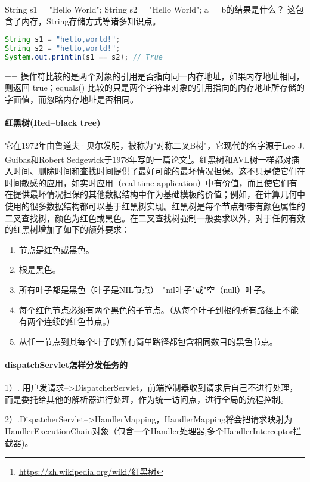 \documentclass[../../../interview-questions.tex]{subfiles}
\begin{document}
String s1 = "Hello World"; String s2 = "Hello World"; a==b的结果是什么？ 这包含了内存，String存储方式等诸多知识点。

\begin{lstlisting}[language=Java]
String s1 = "hello,world!";
String s2 = "hello,world!";
System.out.println(s1 == s2); // True
\end{lstlisting}

== 操作符比较的是两个对象的引用是否指向同一内存地址，如果内存地址相同，则返回 true；equals() 比较的只是两个字符串对象的引用指向的内存地址所存储的字面值，而忽略内存地址是否相同。


\paragraph{红黑树(Red–black tree)}

它在1972年由鲁道夫·贝尔发明，被称为"对称二叉B树"，它现代的名字源于Leo J. Guibas和Robert Sedgewick于1978年写的一篇论文\footnote{\url{https://zh.wikipedia.org/wiki/红黑树}}。红黑树和AVL树一样都对插入时间、删除时间和查找时间提供了最好可能的最坏情况担保。这不只是使它们在时间敏感的应用，如实时应用（real time application）中有价值，而且使它们有在提供最坏情况担保的其他数据结构中作为基础模板的价值；例如，在计算几何中使用的很多数据结构都可以基于红黑树实现。红黑树是每个节点都带有颜色属性的二叉查找树，颜色为红色或黑色。在二叉查找树强制一般要求以外，对于任何有效的红黑树增加了如下的额外要求：

\begin{enumerate}
\item {节点是红色或黑色。}
\item{根是黑色。}
\item{所有叶子都是黑色（叶子是NIL节点）--"nil叶子"或"空（null）叶子。}
\item{每个红色节点必须有两个黑色的子节点。（从每个叶子到根的所有路径上不能有两个连续的红色节点。）}
\item{从任一节点到其每个叶子的所有简单路径都包含相同数目的黑色节点。}
\end{enumerate}

\paragraph{dispatchServlet怎样分发任务的}


1）. 用户发请求-->DispatcherServlet，前端控制器收到请求后自己不进行处理，而是委托给其他的解析器进行处理，作为统一访问点，进行全局的流程控制。

2）.DispatcherServlet-->HandlerMapping，HandlerMapping将会把请求映射为HandlerExecutionChain对象（包含一个Handler处理器,多个HandlerInterceptor拦截器)。
\end{document}
